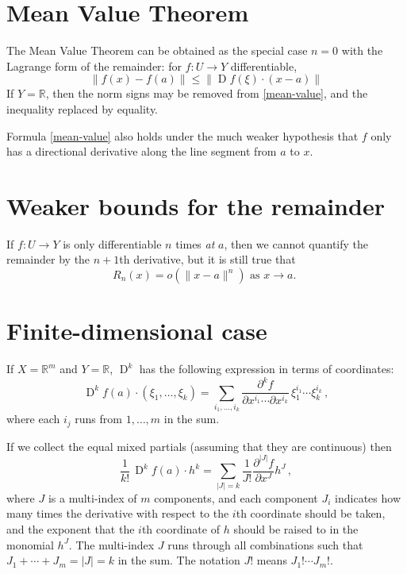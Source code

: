 \documentclass[12pt]{article}
\newcommand{\real}{\mathbb{R}}
\providecommand{\abs}[1]{\lvert#1\rvert}
\providecommand{\norm}[1]{\lVert#1\rVert}
\DeclareMathOperator{\D}{D}
\begin{document}
\section*{Mean Value Theorem}
The Mean Value Theorem can be obtained
as the special case $n=0$ with the Lagrange form of the remainder:
for $f\colon U \to Y$ differentiable,
\begin{equation}\label{mean-value}
\norm{f(x) - f(a)} \leq \norm{\D f(\xi) \cdot (x-a)}
\end{equation}
If $Y = \real$, then the norm signs may be removed from
\eqref{mean-value}, and the inequality replaced by equality.

Formula \eqref{mean-value} also holds under the much
weaker hypothesis
that $f$ only has a directional derivative along the line
segment from $a$ to $x$.

\section*{Weaker bounds for the remainder}
If $f \colon U \to Y$ is only differentiable $n$ times \emph{at} $a$,
then we cannot quantify the remainder by the $n+1$th derivative,
but it is still true
that
\begin{equation}
R_n(x) = o( \norm{x-a}^n ) \text{ as $x \to a$. }
\end{equation}

\section*{Finite-dimensional case}
If $X = \real^m$ and $Y = \real$,
$\D^k$ has the following expression in terms of coordinates:
\[
\D^k f(a) \cdot (\xi_1, \dotsc, \xi_k) = \sum_{i_1, \dotsc, i_k}
\frac{\partial^k f}{\partial x^{i_1} \dotsm \partial x^{i_k}} \,
\xi_1^{i_1} \dotsm \xi_k^{i_k}\,,
\]
where each $i_j$ runs from $1, \dotsc, m$ in the sum.

If we collect the equal mixed partials
(assuming that they are continuous)
then
\[
\frac{1}{k!} \, \D^k f(a) \cdot h^k
= \sum_{\abs{J} = k} \frac{1}{J!} \frac{\partial^{\abs{J}} f}{\partial x^J} h^J\,,
\]
where $J$ is a multi-index of $m$ components, and each component $J_i$ indicates
how many times the derivative with respect to the $i$th coordinate should be taken,
and the exponent that the $i$th coordinate of $h$ should be raised to
in the monomial $h^J$.
The multi-index $J$ runs through all combinations
such that $J_1 + \dotsb + J_m = \abs{J} = k$ in the sum.
The notation $J!$ means $J_1! \dotsm J_m!$.
\end{document}
